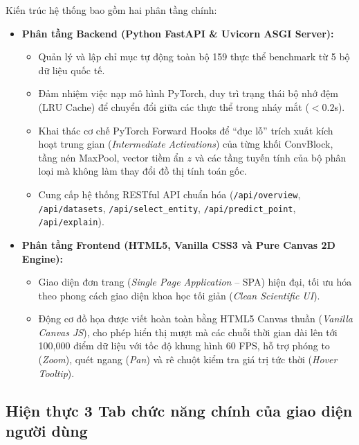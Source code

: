 \documentclass[11pt,journal,onecolumn]{IEEEtran}
\begin{document}
Kiến trúc hệ thống bao gồm hai phân tầng chính:
\begin{itemize}
    \item \textbf{Phân tầng Backend (Python FastAPI \& Uvicorn ASGI Server):}
    \begin{itemize}
        \item Quản lý và lập chỉ mục tự động toàn bộ 159 thực thể benchmark từ 5 bộ dữ liệu quốc tế.
        \item Đảm nhiệm việc nạp mô hình PyTorch, duy trì trạng thái bộ nhớ đệm (LRU Cache) để chuyển đổi giữa các thực thể trong nháy mắt ($< 0.2$s).
        \item Khai thác cơ chế PyTorch Forward Hooks để ``đục lỗ'' trích xuất kích hoạt trung gian (\textit{Intermediate Activations}) của từng khối ConvBlock, tầng nén MaxPool, vector tiềm ẩn $z$ và các tầng tuyến tính của bộ phân loại mà không làm thay đổi đồ thị tính toán gốc.
        \item Cung cấp hệ thống RESTful API chuẩn hóa (\texttt{/api/overview}, \texttt{/api/datasets}, \texttt{/api/select\_entity}, \texttt{/api/predict\_point}, \texttt{/api/explain}).
    \end{itemize}
    
    \item \textbf{Phân tầng Frontend (HTML5, Vanilla CSS3 và Pure Canvas 2D Engine):}
    \begin{itemize}
        \item Giao diện đơn trang (\textit{Single Page Application} -- SPA) hiện đại, tối ưu hóa theo phong cách giao diện khoa học tối giản (\textit{Clean Scientific UI}).
        \item Động cơ đồ họa được viết hoàn toàn bằng HTML5 Canvas thuần (\textit{Vanilla Canvas JS}), cho phép hiển thị mượt mà các chuỗi thời gian dài lên tới 100,000 điểm dữ liệu với tốc độ khung hình 60 FPS, hỗ trợ phóng to (\textit{Zoom}), quét ngang (\textit{Pan}) và rê chuột kiểm tra giá trị tức thời (\textit{Hover Tooltip}).
    \end{itemize}
\end{itemize}

\subsection{Hiện thực 3 Tab chức năng chính của giao diện người dùng}
\end{document}
